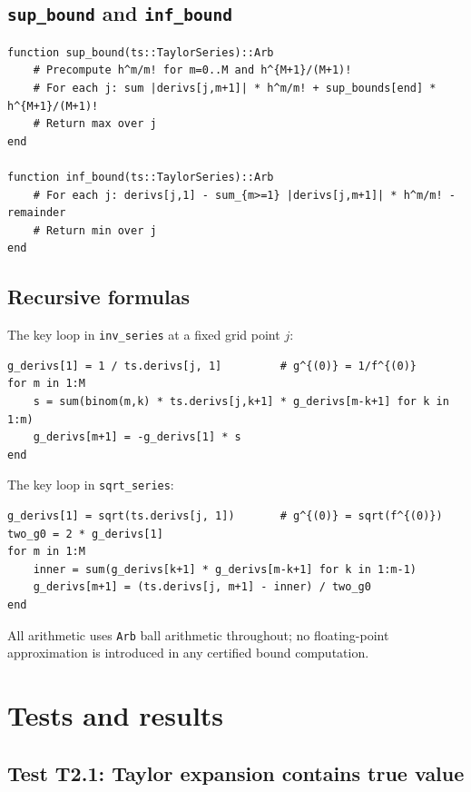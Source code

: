 \documentclass[11pt]{article}
\theoremstyle{definition}
\begin{document}
\subsection{\texttt{sup\_bound} and \texttt{inf\_bound}}

\begin{lstlisting}
function sup_bound(ts::TaylorSeries)::Arb
    # Precompute h^m/m! for m=0..M and h^{M+1}/(M+1)!
    # For each j: sum |derivs[j,m+1]| * h^m/m! + sup_bounds[end] * h^{M+1}/(M+1)!
    # Return max over j
end

function inf_bound(ts::TaylorSeries)::Arb
    # For each j: derivs[j,1] - sum_{m>=1} |derivs[j,m+1]| * h^m/m! - remainder
    # Return min over j
end
\end{lstlisting}

\subsection{Recursive formulas}

The key loop in \texttt{inv\_series} at a fixed grid point $j$:

\begin{lstlisting}
g_derivs[1] = 1 / ts.derivs[j, 1]         # g^{(0)} = 1/f^{(0)}
for m in 1:M
    s = sum(binom(m,k) * ts.derivs[j,k+1] * g_derivs[m-k+1] for k in 1:m)
    g_derivs[m+1] = -g_derivs[1] * s
end
\end{lstlisting}

The key loop in \texttt{sqrt\_series}:

\begin{lstlisting}
g_derivs[1] = sqrt(ts.derivs[j, 1])       # g^{(0)} = sqrt(f^{(0)})
two_g0 = 2 * g_derivs[1]
for m in 1:M
    inner = sum(g_derivs[k+1] * g_derivs[m-k+1] for k in 1:m-1)
    g_derivs[m+1] = (ts.derivs[j, m+1] - inner) / two_g0
end
\end{lstlisting}

All arithmetic uses \texttt{Arb} ball arithmetic throughout; no floating-point
approximation is introduced in any certified bound computation.

\section{Tests and results}

\subsection{Test T2.1: Taylor expansion contains true value}
\end{document}

